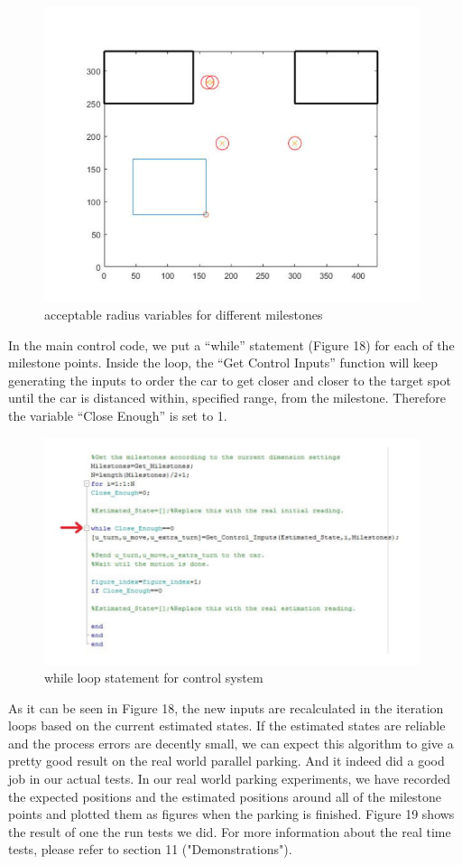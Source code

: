 \documentclass[12pt, letterpaper]{amsart} %
\numberwithin{equation}{section}
\begin{document}
\begin{figure}[h!]
\includegraphics[width=110mm]{fig_17.png}
\caption{acceptable radius variables for different milestones}
\label{fig:figure17}	
\end{figure}
\newpage
In the main control code, we put a “while” statement (Figure 18) for each of the milestone points. Inside the loop, 
the “Get Control Inputs” function will keep generating 
the inputs to order the car to get closer and closer to 
the target spot until the car is distanced within,
specified range, from the milestone. Therefore the
variable “Close Enough” is set to 1.

\begin{figure}[h!]
\includegraphics[width=110mm]{fig_18.png}
\caption{while loop statement for control system}
\label{fig:figure18}	
\end{figure}


As it can be seen in Figure 18, the new inputs are 
recalculated in the iteration loops based on the 
current estimated states. 
If the estimated states are reliable and the process 
errors are decently small, we can expect this 
algorithm to give a pretty good result on the real 
world parallel parking. And it indeed did a good job in 
our actual tests.
In our real world parking experiments, we have recorded 
the expected positions and the estimated positions 
around all of the milestone points and plotted them as 
figures when the parking is finished. Figure 19 shows 
the result of one the run tests we did. For more information about the real time tests, please refer to section 11 ("Demonstrations").
\end{document}
